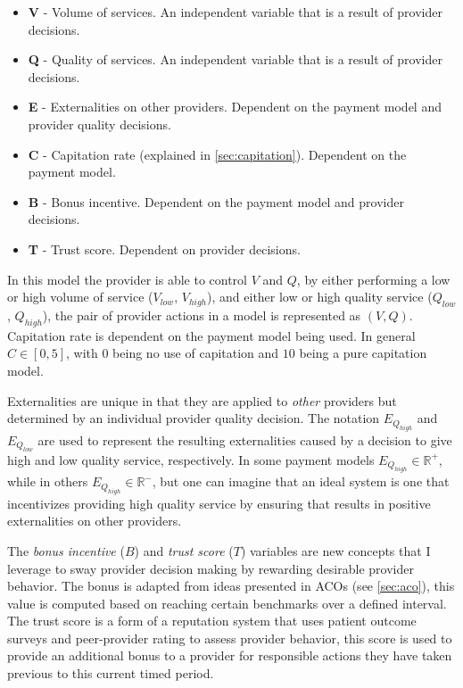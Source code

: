 \documentclass{article}
\begin{document}
\begin{itemize}
    \item \textbf{V} - Volume of services. An independent variable that is a result of provider decisions.
    \item \textbf{Q} - Quality of services. An independent variable that is a result of provider decisions.
    \item \textbf{E} - Externalities on other providers. Dependent on the payment model and provider quality decisions.
    \item \textbf{C} - Capitation rate (explained in \ref{sec:capitation}). Dependent on the payment model.
    \item \textbf{B} - Bonus incentive. Dependent on the payment model and provider decisions.
    \item \textbf{T} - Trust score. Dependent on provider decisions.
\end{itemize}

In this model the provider is able to control $V$ and $Q$, by either performing a low or high volume of service ($V_{low}$, $V_{high}$), and either low or high quality service ($Q_{low}$, $Q_{high}$), the pair of provider actions in a model is represented as $(V, Q)$. Capitation rate is dependent on the payment model being used. In general $C \in [0, 5]$, with $0$ being no use of capitation and $10$ being a pure capitation model.

Externalities are unique in that they are applied to \emph{other} providers but determined by an individual provider quality decision. The notation $E_{Q_{high}}$ and $E_{Q_{low}}$ are used to represent the resulting externalities caused by a decision to give high and low quality service, respectively. In some payment models $E_{Q_{high}} \in \mathbb{R}^+$, while in others $E_{Q_{high}} \in \mathbb{R}^-$, but one can imagine that an ideal system is one that incentivizes providing high quality service by ensuring that results in positive externalities on other providers.

The \emph{bonus incentive} ($B$) and \emph{trust score} ($T$) variables are new concepts that I leverage to sway provider decision making by rewarding desirable provider behavior. The bonus is adapted from ideas presented in ACOs (see \ref{sec:aco}), this value is computed based on reaching certain benchmarks over a defined interval. The trust score is a form of a reputation system \cite{tim} that uses patient outcome surveys and peer-provider rating to assess provider behavior, this score is used to provide an additional bonus to a provider for responsible actions they have taken previous to this current timed period.
\end{document}
